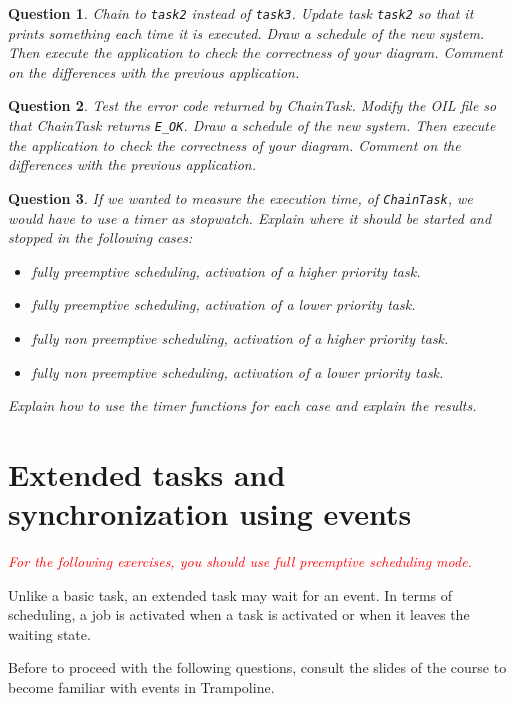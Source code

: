 \documentclass[11pt]{report}
\newtheorem{ex}{Question}
\begin{document}
\begin{ex}
    Chain to \texttt{task2} instead of \texttt{task3}.
    Update task \texttt{task2} so that it prints something each time it is executed.
    Draw a schedule of the new system.
    Then execute the application to check the correctness of your diagram.
    Comment on the differences with the previous application.
\end{ex}

\begin{ex}
    Test the error code returned by ChainTask.
    Modify the OIL file so that ChainTask returns \texttt{E\_OK}.
    Draw a schedule of the new system.
    Then execute the application to check the correctness of your diagram.
    Comment on the differences with the previous application.
\end{ex}

\begin{ex}
	If we wanted to measure the execution time, of \lstinline{ChainTask}, we would have to use a timer as stopwatch. Explain where it should be started and stopped in the following cases:
    \begin{itemize}
        \item fully preemptive scheduling, activation of a higher priority task.
        \item fully preemptive scheduling, activation of a lower priority task.
        \item fully non preemptive scheduling, activation of a higher priority task.
        \item fully non preemptive scheduling, activation of a lower priority task.
    \end{itemize}

    Explain how to use the timer functions for each case and explain the results.
\end{ex}

\section{Extended tasks and synchronization using events}

\textcolor{red}{\emph{For the following exercises, you should use full preemptive scheduling mode.}}

Unlike a basic task, an extended task may wait for an event.
In terms of scheduling, a job is activated when a task is activated or when it leaves the waiting state.

Before to proceed with the following questions, consult the slides of the course to become familiar with events in Trampoline.
\end{document}
